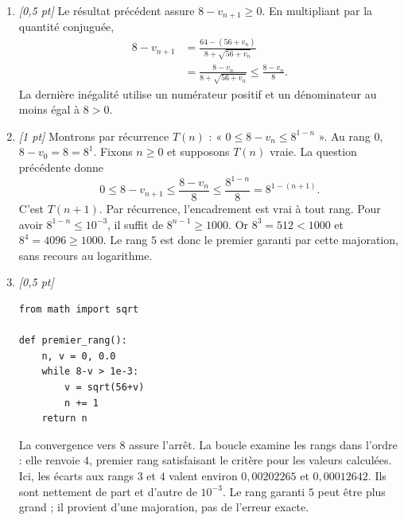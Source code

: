 \begin{enumerate}
\item \textit{[0,5 pt]} Le résultat précédent assure $8-v_{n+1}\ge0$. En multipliant par la quantité conjuguée,
\[\begin{aligned}8-v_{n+1}&=\frac{64-(56+v_n)}{8+\sqrt{56+v_n}}\\&=\frac{8-v_n}{8+\sqrt{56+v_n}}\le\frac{8-v_n}{8}.\end{aligned}\]
La dernière inégalité utilise un numérateur positif et un dénominateur au moins égal à $8>0$.

\item \textit{[1 pt]} Montrons par récurrence $T(n)$ : « $0\le 8-v_n\le 8^{1-n}$ ».
Au rang $0$, $8-v_0=8=8^1$. Fixons $n\ge0$ et supposons $T(n)$ vraie. La question précédente donne
\[0\le 8-v_{n+1}\le\frac{8-v_n}{8}\le\frac{8^{1-n}}{8}=8^{1-(n+1)}.\]
C'est $T(n+1)$. Par récurrence, l'encadrement est vrai à tout rang.
Pour avoir $8^{1-n}\le10^{-3}$, il suffit de $8^{n-1}\ge1000$.
Or $8^{3}=512<1000$ et $8^{4}=4096\ge1000$. Le rang $5$ est donc le premier garanti par cette majoration, sans recours au logarithme.


\item \textit{[0,5 pt]} 
\begin{lstlisting}
from math import sqrt

def premier_rang():
    n, v = 0, 0.0
    while 8-v > 1e-3:
        v = sqrt(56+v)
        n += 1
    return n
\end{lstlisting}
La convergence vers $8$ assure l'arrêt. La boucle examine les rangs dans l'ordre : elle renvoie $4$, premier rang satisfaisant le critère pour les valeurs calculées. Ici, les écarts aux rangs $3$ et $4$ valent environ $0{,}00202265$ et $0{,}00012642$. Ils sont nettement de part et d'autre de $10^{-3}$. Le rang garanti $5$ peut être plus grand ; il provient d'une majoration, pas de l'erreur exacte.

\end{enumerate}


